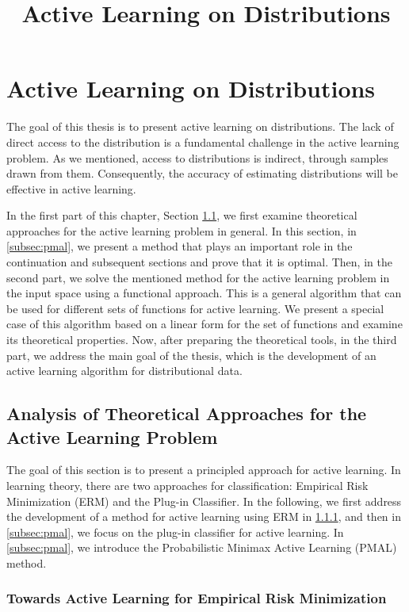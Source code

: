 \documentclass[12pt]{article}
\title{Active Learning on Distributions}
\author{}
\date{}
\begin{document}
	
	\maketitle
	
	\section{Active Learning on Distributions}
	The goal of this thesis is to present active learning on distributions. The lack of direct access to the distribution is a fundamental challenge in the active learning problem. As we mentioned, access to distributions is indirect, through samples drawn from them. Consequently, the accuracy of estimating distributions will be effective in active learning.
	
	In the first part of this chapter, Section \ref{sec:theoretical}, we first examine theoretical approaches for the active learning problem in general. In this section, in \ref{subsec:pmal}, we present a method that plays an important role in the continuation and subsequent sections and prove that it is optimal. Then, in the second part, we solve the mentioned method for the active learning problem in the input space using a functional approach. This is a general algorithm that can be used for different sets of functions for active learning. We present a special case of this algorithm based on a linear form for the set of functions and examine its theoretical properties. Now, after preparing the theoretical tools, in the third part, we address the main goal of the thesis, which is the development of an active learning algorithm for distributional data.
	
	\subsection{Analysis of Theoretical Approaches for the Active Learning Problem}
	\label{sec:theoretical}
	
	The goal of this section is to present a principled approach for active learning. In learning theory, there are two approaches for classification: Empirical Risk Minimization (ERM) and the Plug-in Classifier. In the following, we first address the development of a method for active learning using ERM in \ref{subsec:erm-al}, and then in \ref{subsec:pmal}, we focus on the plug-in classifier for active learning. In \ref{subsec:pmal}, we introduce the Probabilistic Minimax Active Learning (PMAL) method.
	
	\subsubsection{Towards Active Learning for Empirical Risk Minimization}
	\label{subsec:erm-al}
	
\end{document}
